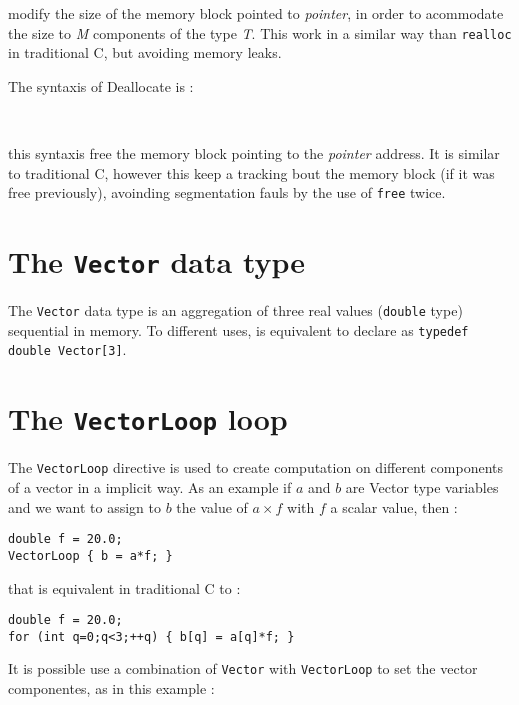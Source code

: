 \documentclass[a4paper,12pt]{article}
\begin{document}
\noindent
modify the size of the memory block pointed to \emph{pointer}, in order to
acommodate the size to \emph{M} components of the type \emph{T}. This work in a
similar way than \texttt{realloc} in traditional C, but avoiding memory leaks.

The syntaxis of Deallocate is :

\vspace{15pt}
 \\
\vspace{15pt}

\noindent
this syntaxis free the memory block pointing to the \emph{pointer}
address. It is similar to traditional C, however this keep a tracking bout
the memory block (if it was free previously), avoinding segmentation fauls
by the use of \texttt{free} twice.

\section{The \texttt{Vector} data type}

The \verb'Vector' data type is an aggregation of three real values
(\verb'double' type) sequential in memory. To different uses, is equivalent to
declare as \verb'typedef double Vector[3]'.

\section{The \texttt{VectorLoop} loop}

The \verb'VectorLoop' directive is used to create computation on different
components of a vector in a implicit way. As an example if $a$ and $b$ are
Vector type variables and we want to assign to $b$ the value of $a\times f$
with $f$ a scalar value, then :

\lstset{language=C}
\begin{lstlisting}
double f = 20.0;
VectorLoop { b = a*f; }
\end{lstlisting}

\noindent
that is equivalent in traditional C to :

\lstset{language=C}
\begin{lstlisting}
double f = 20.0;
for (int q=0;q<3;++q) { b[q] = a[q]*f; }
\end{lstlisting}

It is possible use a combination of \verb'Vector' with \verb'VectorLoop' to set
the vector componentes, as in this example :
\end{document}
